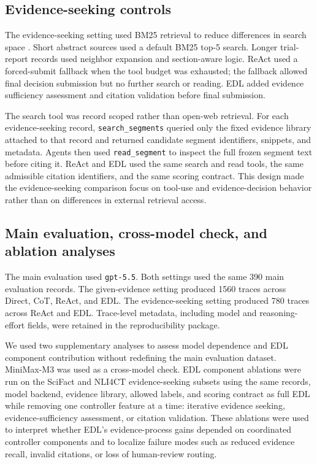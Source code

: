 \documentclass[11pt,a4paper]{article}
\begin{document}
\subsection{Evidence-seeking controls}

The evidence-seeking setting used BM25 retrieval to reduce differences in search space \cite{robertson1995okapi,robertson2009bm25}. Short abstract sources used a default BM25 top-5 search. Longer trial-report records used neighbor expansion and section-aware logic. ReAct used a forced-submit fallback when the tool budget was exhausted; the fallback allowed final decision submission but no further search or reading. EDL added evidence sufficiency assessment and citation validation before final submission.

The search tool was record scoped rather than open-web retrieval. For each evidence-seeking record, \texttt{search\_segments} queried only the fixed evidence library attached to that record and returned candidate segment identifiers, snippets, and metadata. Agents then used \texttt{read\_segment} to inspect the full frozen segment text before citing it. ReAct and EDL used the same search and read tools, the same admissible citation identifiers, and the same scoring contract. This design made the evidence-seeking comparison focus on tool-use and evidence-decision behavior rather than on differences in external retrieval access.

\subsection{Main evaluation, cross-model check, and ablation analyses}

The main evaluation used \texttt{gpt-5.5}. Both settings used the same 390 main evaluation records. The given-evidence setting produced 1560 traces across Direct, CoT, ReAct, and EDL. The evidence-seeking setting produced 780 traces across ReAct and EDL. Trace-level metadata, including model and reasoning-effort fields, were retained in the reproducibility package.

We used two supplementary analyses to assess model dependence and EDL component contribution without redefining the main evaluation dataset. MiniMax-M3 was used as a cross-model check. EDL component ablations were run on the SciFact and NLI4CT evidence-seeking subsets using the same records, model backend, evidence library, allowed labels, and scoring contract as full EDL while removing one controller feature at a time: iterative evidence seeking, evidence-sufficiency assessment, or citation validation. These ablations were used to interpret whether EDL's evidence-process gains depended on coordinated controller components and to localize failure modes such as reduced evidence recall, invalid citations, or loss of human-review routing.
\end{document}
